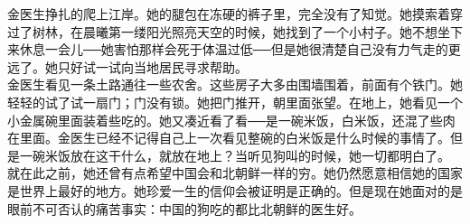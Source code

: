 金医生挣扎的爬上江岸。她的腿包在冻硬的裤子里，完全没有了知觉。她摸索着穿过了树林，在晨曦第一缕阳光照亮天空的时候，她找到了一个小村子。她不想坐下来休息一会儿──她害怕那样会死于体温过低──但是她很清楚自己没有力气走的更远了。她只好试一试向当地居民寻求帮助。\\

金医生看见一条土路通往一些农舍。这些房子大多由围墙围着，前面有个铁门。她轻轻的试了试一扇门；门没有锁。她把门推开，朝里面张望。在地上，她看见一个小金属碗里面装着些吃的。她又凑近看了看──是一碗米饭，白米饭，还混了些肉在里面。金医生已经不记得自己上一次看见整碗的白米饭是什么时候的事情了。但是一碗米饭放在这干什么，就放在地上？当听见狗叫的时候，她一切都明白了。\\

就在此之前，她还曾有点希望中国会和北朝鲜一样的穷。她仍然愿意相信她的国家是世界上最好的地方。她珍爱一生的信仰会被证明是正确的。但是现在她面对的是眼前不可否认的痛苦事实：中国的狗吃的都比北朝鲜的医生好。\\
